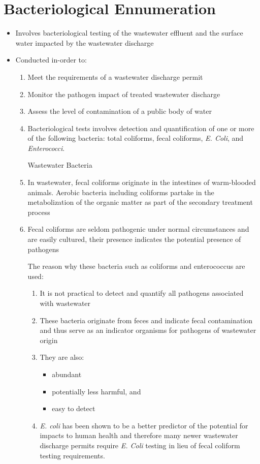 \section{Bacteriological Ennumeration}
\begin{itemize}
	\item Involves bacteriological testing of the wastewater effluent and the surface water impacted by the wastewater discharge
	
	\item Conducted in-order to:
		\begin{enumerate}
			\item Meet the requirements of a wastewater discharge permit
			\item Monitor the pathogen impact of treated wastewater discharge
			\item Assess the level of contamination of a public body of water
			\item Bacteriological tests involves detection and quantification of one or more of the following bacteria:  total coliforms, fecal coliforms, \textit{E. Coli}, and \textit{Enterococci}. 
\begin{center}
Wastewater Bacteria
\end{center}
	
	\item  In wastewater, fecal coliforms originate in the intestines of warm-blooded animals.  Aerobic bacteria including coliforms partake in the metabolization of the organic matter as part of the secondary treatment process
\item Fecal coliforms are seldom pathogenic under normal circumstances and are easily cultured, their presence indicates the potential presence of pathogens

The reason why these bacteria such as coliforms and enterococcus are used:
		\begin{enumerate}
			\item It is not practical to detect and quantify all pathogens associated with wastewater
			\item These bacteria originate from feces and indicate fecal contamination and thus serve as an indicator organisms for pathogens of wastewater origin
			\item They are also:
				\begin{itemize}
					\item abundant
					\item potentially less harmful, and
					\item easy to detect
				\end{itemize}
			\item \textit{E. coli} has been shown to be a better predictor of the potential for impacts to human health and therefore many newer wastewater discharge permits require \textit{E. Coli} testing in lieu of fecal coliform testing requirements.
		\end{enumerate}
		\end{enumerate}

\end{itemize}
 

